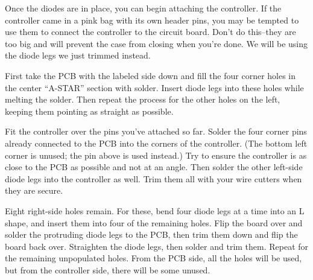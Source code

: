 \documentclass{article}
\begin{document}
Once the diodes are in place, you can begin attaching the controller.
If the controller came in a pink bag with its own header pins, you may
be tempted to use them to connect the controller to the circuit
board. Don't do this--they are too big and will prevent the case from
closing when you're done. We will be using the diode legs we just
trimmed instead.

\vspace{1em}

First take the PCB with the labeled side down and fill the four corner
holes in the center ``A-STAR'' section with solder. Insert diode legs
into these holes while melting the solder. Then repeat the process for
the other holes on the left, keeping them pointing as straight as possible.

\vspace{1em}
\noindent{}
\vspace{1em}

Fit the controller over the pins you've attached so far. Solder the
four corner pins already connected to the PCB into the corners of the
controller. (The bottom left corner is unused; the pin above is used
instead.) Try to ensure the controller is as close to the PCB as
possible and not at an angle. Then solder the other left-side diode
legs into the controller as well. Trim them all with your wire
cutters when they are secure.

\vspace{1em}

Eight right-side holes remain. For these, bend four diode legs at a
time into an L shape, and insert them into four of the remaining
holes. Flip the board over and solder the protruding diode legs to the
PCB, then trim them down and flip the board back over. Straighten the
diode legs, then solder and trim them. Repeat for the remaining
unpopulated holes. From the PCB side, all the holes will be used, but
from the controller side, there will be some unused.
\end{document}
